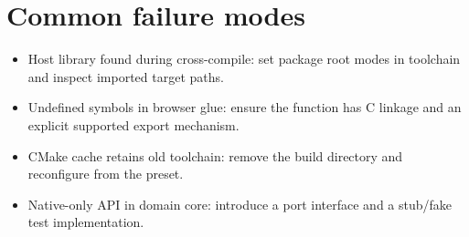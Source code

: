 \documentclass[11pt,letterpaper]{article}
\begin{document}
\section{Common failure modes}
\begin{itemize}
\item Host library found during cross-compile: set package root modes in toolchain and inspect imported target paths.
\item Undefined symbols in browser glue: ensure the function has C linkage and an explicit supported export mechanism.
\item CMake cache retains old toolchain: remove the build directory and reconfigure from the preset.
\item Native-only API in domain core: introduce a port interface and a stub/fake test implementation.
\end{itemize}
\end{document}
